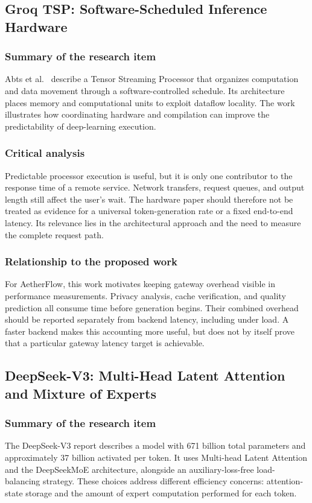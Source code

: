 \subsection{Groq TSP: Software-Scheduled Inference Hardware}
\subsubsection{Summary of the research item}
Abts et al.\ \cite{ref:GroqTSP} describe a Tensor Streaming Processor that organizes computation and data movement through a software-controlled schedule. Its architecture places memory and computational units to exploit dataflow locality. The work illustrates how coordinating hardware and compilation can improve the predictability of deep-learning execution.

\subsubsection{Critical analysis}
Predictable processor execution is useful, but it is only one contributor to the response time of a remote service. Network transfers, request queues, and output length still affect the user's wait. The hardware paper should therefore not be treated as evidence for a universal token-generation rate or a fixed end-to-end latency. Its relevance lies in the architectural approach and the need to measure the complete request path.

\subsubsection{Relationship to the proposed work}
For AetherFlow, this work motivates keeping gateway overhead visible in performance measurements. Privacy analysis, cache verification, and quality prediction all consume time before generation begins. Their combined overhead should be reported separately from backend latency, including under load. A faster backend makes this accounting more useful, but does not by itself prove that a particular gateway latency target is achievable.

\subsection{DeepSeek-V3: Multi-Head Latent Attention and Mixture of Experts}
\subsubsection{Summary of the research item}
The DeepSeek-V3 report \cite{ref:DeepSeekV3} describes a model with 671 billion total parameters and approximately 37 billion activated per token. It uses Multi-head Latent Attention and the DeepSeekMoE architecture, alongside an auxiliary-loss-free load-balancing strategy. These choices address different efficiency concerns: attention-state storage and the amount of expert computation performed for each token.

